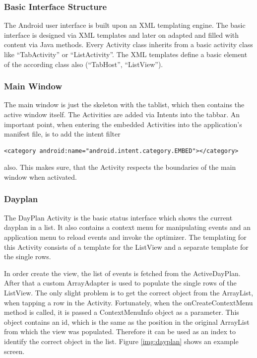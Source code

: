 \subsubsection{Basic Interface Structure} %
\label{ssub:Basic Interface Structure}
The Android user interface is built upon an XML templating engine.
The basic interface is designed via XML templates and later on adapted
and filled with content via Java methods. Every Activity class inherits
from a basic activity class like ``TabActivity'' or ``ListActivity''.
The XML templates define a basic element of the according class also
(``TabHost'', ``ListView'').


\subsubsection{Main Window} %
\label{ssub:MainWindow}

The main window is just the skeleton with the tablist, which then
contains the active window itself. The Activities are added
via Intents into the tabbar. An important point, when entering the embedded
Activities into the application's manifest file, is to add the intent filter
\begin{verbatim}
<category android:name="android.intent.category.EMBED"></category>
\end{verbatim}
also. This makes sure, that the Activity respects the boundaries of the
main window when activated.


\subsubsection{Dayplan} %
\label{ssub:Dayplan}
The DayPlan Activity is the basic status interface which shows the current
dayplan in a list. It also contains a context menu for manipulating events
and an application menu to reload events and invoke the optimizer. The
templating for this Activity consists of a template for the ListView and a
separate template for the single rows.

In order create the view, the list of events is fetched from the
ActiveDayPlan. After that a custom ArrayAdapter is used to populate the
single rows of the ListView.
The only slight problem is to get the correct object from the ArrayList,
when tapping a row in the Activity. Fortunately, when the onCreateContextMenu
method is called, it is passed a ContextMenuInfo object as a parameter. This
object contains an id, which is the same as the position in the original
ArrayList from which the view was populated. Therefore it can be used as an
index to identify the correct object in the list. Figure \ref{img:dayplan}
shows an example screen.

